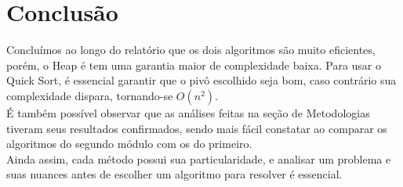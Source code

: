 \documentclass[fontsize=11pt]{article}
\begin{document}
  \section{Conclusão}
  Concluímos ao longo do relatório que os dois algoritmos são muito eficientes,
  porém, o Heap é tem uma garantia maior de complexidade baixa. Para usar o Quick Sort,
  é essencial garantir que o pivô escolhido seja bom, caso contrário sua 
  complexidade dispara, tornando-se $O(n^2)$.
  \\ É também possível observar que as análises feitas na seção de Metodologias 
  tiveram seus resultados confirmados, sendo mais fácil constatar ao comparar
  os algoritmos do segundo módulo com os do primeiro.
  \\ Ainda assim, cada método possui sua particularidade, e analisar um problema
  e suas nuances antes de escolher um algoritmo para resolver é essencial.
\printbibliography[heading=bibintoc, title={Referências}]
\end{document}
